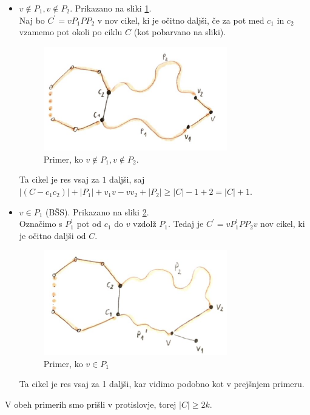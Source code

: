 \documentclass[a4paper,11pt]{article}
\begin{document}
\begin{itemize}
    \item $v \notin P_1, v \notin P_2$. Prikazano na sliki \ref{pot1}.
        \\
        Naj bo $C^{'} = v P_1 P P_2$ v nov cikel, ki je očitno daljši, če za pot med $c_1$ in $c_2$ vzamemo pot okoli po ciklu $C$ (kot pobarvano na sliki).
        \begin{figure}[ht!]
            \centering
            \includegraphics[width=80mm]{Slike/3_1.png}
            \caption{Primer, ko $v \notin P_1, v \notin P_2$.}\label{pot1}
        \end{figure}
        Ta cikel je res vsaj za $1$ daljši, saj $|(C - c_1c_2)| + |P_1| + v_1v - vv_2 + |P_2| \geq |C| - 1 + 2 = |C| + 1$.

    \item $v \in P_1$ (BŠS). Prikazano na sliki \ref{pot2}.
        \\
        Označimo s $P_1^{'}$ pot od $c_1$ do $v$ vzdolž $P_1$. Tedaj je $C^{'} = v P_1^{'} P P_2 v$ nov cikel, ki je očitno daljši od $C$. 
        \begin{figure}[ht!]
            \centering
            \includegraphics[width=80mm]{Slike/3_2.png}
            \caption{Primer, ko $v \in P_1$}\label{pot2}
        \end{figure}
        Ta cikel je res vsaj za 1 daljši, kar vidimo podobno kot v prejšnjem primeru.

\end{itemize}
V obeh primerih smo prišli v protislovje, torej $|C| \geq 2k$.
\end{document}
